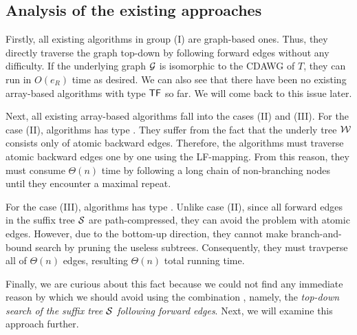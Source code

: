 \subsection{Analysis of the existing approaches}
Firstly, all existing algorithms in group (I) are graph-based ones. Thus, they directly traverse the graph top-down by following forward edges without any difficulty. 
If the underlying graph $\mathcal{G}$ is isomorphic to the CDAWG of $T$, they can run in $O(e_R)$ time as desired. We can also see that there have been no existing array-based algorithms with type $\mbox{\ensuremath{\mathsf{T}}\ensuremath{\mathsf{F}}}$ so far. We will come back to this issue later. 

Next, all existing array-based algorithms fall into the cases (II) and (III). 
For the case (II), algorithms has type \tdbw. They suffer from the fact that the underly tree $\mathcal{W}$ consists only of atomic backward edges. Therefore, the algorithms must traverse atomic backward edges one by one using the LF-mapping. From this reason, they must consume $\Theta(n)$ time by following a long chain of non-branching nodes until they  encounter a maximal repeat. 

For the case (III), algorithms has type \bufw. Unlike case (II), since all forward edges in the suffix tree $\mathcal{S}$ are path-compressed, they can avoid the problem with atomic edges. However, due to the bottom-up direction, they cannot make branch-and-bound search by pruning the useless subtrees. Consequently, they must travperse all of $\Theta(n)$ edges, resulting $\Theta(n)$ total running time. 

Finally, we are curious about this fact because we could not find any immediate reason by which we should avoid using the combination {\tdfw}, namely, the \textit{top-down search of the suffix tree $\mathcal{S}$ following forward edges}.  
Next, we will examine this approach further. 

